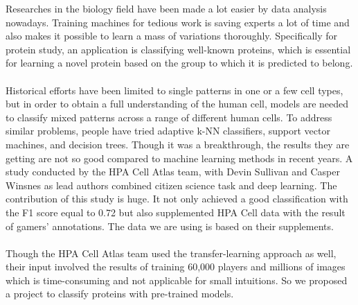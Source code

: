 \documentclass{article}
\begin{document}
Researches in the biology field have been made a lot easier by data analysis nowadays. Training machines for tedious work is saving experts a lot of time and also makes it possible to learn a mass of variations thoroughly. Specifically for protein study, an application is classifying well-known proteins, which is essential for learning a novel protein based on the group to which it is predicted to belong\cite{subcellular}. 
\\\\
Historical efforts have been limited to single patterns in one or a few cell types, but in order to obtain a full understanding of the human cell, models are needed to classify mixed patterns across a range of different human cells. To address similar problems, people have tried adaptive k-NN classifiers\cite{knn}, support vector machines\cite{svm}, and decision trees\cite{dtree}. Though it was a breakthrough, the results they are getting are not so good compared to machine learning methods in recent years. A study conducted by the HPA Cell Atlas team\cite{nature}, with Devin Sullivan and Casper Winsnes as lead authors combined citizen science task and deep learning. The contribution of this study is huge. It not only achieved a good classification with the F1 score equal to 0.72 but also supplemented HPA Cell data with the result of gamers’ annotations. The data we are using is based on their supplements.
\\\\
Though the HPA Cell Atlas team used the transfer-learning approach as well, their input involved the results of training 60,000 players and millions of images which is time-consuming and not applicable for small intuitions. So we proposed a project to classify proteins with pre-trained models.

  
\end{document}

